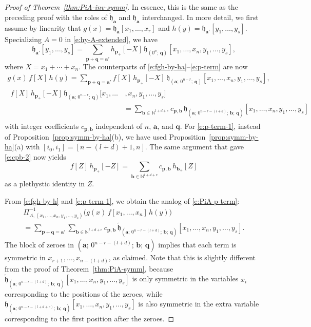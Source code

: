 \documentclass[12pt]{amsart}
\theoremstyle{definition}
\theoremstyle{remark}
\newcommand{\NN}{{\mathbb N}}
\newcommand{\aA}{{\mathbf a}}
\newcommand{\bb}{{\mathbf b}}
\newcommand{\pp}{{\mathbf p}}
\newcommand{\qq}{{\mathbf q}}
\newcommand{\fh}{{\mathfrak h}}
\newcommand{\tfh}{{\widetilde{\mathfrak h}}}
\begin{document}
\begin{proof}[Proof of Theorem~\ref{thm:PiA-inv-symm}]

In essence, this is the same as the preceding proof with the roles of
$\tfh _{\aA }$ and $\fh_{\aA }$ interchanged.  In more detail, we
first assume by linearity that $g(x) = \fh_{\aA }[x_{1}, \ldots,
x_{r}]$ and $h(y) = \fh_{\aA '}[y_{1}, \ldots, y_{s}]$.  Specializing
$A=0$ in \eqref{e:hy-A-extended}, we have
\begin{equation}\label{e:hy-extended}
\fh_{\aA '}[y_{1}, \ldots, y_{s}] = \sum _{\pp +\qq =\aA '} h_{\pp
_{+}}[-X]\, \fh_{(0^{n};\, \qq) }[x_{1}, \ldots, x_{n}, y_{1}, \ldots,
y_{s}],
\end{equation}
where $X = x_{1}+\cdots +x_{n}$.  The counterparts of
\eqref{e:fgh-by-ha}--\eqref{e:p-term} are now
\begin{gather}\label{e:fgh-by-h}
g(x)\, f[X]\, h(y) = \sum _{\pp +\qq =\aA '} f[X]\,
h_{\pp _{+}}[-X]\, \fh_{(\aA ;\, 0^{n-r};\, \qq) }[x_{1},
\ldots, x_{n}, y_{1}, \ldots, y_{s}],\\
\label{e:p-term-1}
\begin{aligned}
f[X]\, h_{\pp _{+}}[-X] \, \fh_{(\aA ;\, 0^{n-r};\, \qq)
}[x_{1}, \ldots & \, , x_{n}, y_{1}, \ldots, y_{s}]\\
& =  \sum _{\bb \in \NN ^{l+d+e}} c_{\pp ,\bb }\, \fh_{(\aA ;\,
0^{n-r-(l+d)};\, \bb ;\, \qq )} [x_{1}, \ldots, x_{n}, y_{1}, \ldots,
y_{s}]
\end{aligned}
\end{gather}
with integer coefficients $c_{\pp ,\bb }$ independent of $n$, $\aA $,
and $\qq $.  For \eqref{e:p-term-1}, instead of
Proposition~\ref{prop:symm-by-ha}(b), we have used
Proposition~\ref{prop:symm-by-ha}(a) with $[i_{0},i_{1}] =
[n-(l+d)+1,n]$.  The same argument that gave \eqref{e:cpb-2} now
yields
\begin{equation}\label{e:cpb-3}
f[Z]\, h_{\pp _{+}}[-Z] = \sum _{\bb \in \NN ^{l+d+e}} c_{\pp
,\bb }\, h _{\bb _{+}} [Z]
\end{equation}
as a plethystic identity in $Z$.

From \eqref{e:fgh-by-h} and \eqref{e:p-term-1}, we obtain the analog of
\eqref{e:PiA-p-term}:
\begin{multline}\label{e:PiA-inv-p-term}
\Pi _{A,(x_{1},\ldots,x_{n},y_{1},\ldots,y_{s})}^{-1} \bigl( g(x)\,
f[x_{1},\ldots,x_{n}]\, h(y) \bigr)\\
= \sum _{\pp +\qq =\aA '}\sum _{\bb \in \NN ^{l+d+e}} c_{\pp ,\bb }\,
\tfh _{(\aA ;\, 0^{n-r-(l+d)};\, \bb ;\, \qq )} [x_{1}, \ldots, x_{n},
y_{1}, \ldots, y_{s}].
\end{multline}
The block of zeroes in $(\aA ;\, 0^{n-r-(l+d)};\, \bb ;\, \qq )$
implies that each term is symmetric in $x_{r+1},\ldots,x_{n-(l+d)}$,
as claimed.  Note that this is slightly different from the proof of
Theorem~\ref{thm:PiA-symm}, because $\tfh _{(\aA ;\,
0^{n-r-(l+d)};\, \bb ;\, \qq
)}[x_{1},\ldots,x_{n},y_{1},\ldots,y_{s}]$ is only symmetric in the
variables $x_{i}$ corresponding to the positions of the zeroes, while
$\fh_{(\aA ;\, 0^{n-r-(l+d+e)};\, \bb ;\, \qq
)}[x_{1},\ldots,x_{n},y_{1},\ldots,y_{s}]$ is also symmetric in the
extra variable corresponding to the first position after the zeroes.


\end{proof}
\end{document}
